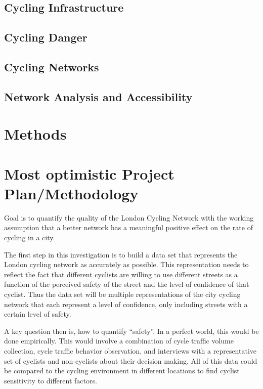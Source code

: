 \documentclass[11pt]{article} %
\begin{document}
\subsection{Cycling Infrastructure}

\subsection{Cycling Danger}

\subsection{Cycling Networks}

\subsection{Network Analysis and Accessibility}

\section{Methods}


\section{Most optimistic Project Plan/Methodology}

Goal is to quantify the quality of the London Cycling Network with the working assumption that a better network has a meaningful positive effect on the rate of cycling in a city. 

The first step in this investigation is to build a data set that represents the London cycling network as accurately as possible. This representation needs to reflect the fact that different cyclists are willing to use different streets as a function of the perceived safety of the street and the level of confidence of that cyclist. Thus the data set will be multiple representations of the city cycling network that each represent a level of confidence, only including streets with a certain level of safety. 

A key question then is, how to quantify ``safety''. In a perfect world, this would be done empirically. This would involve a combination of cycle traffic volume collection, cycle traffic behavior observation, and interviews with a representative set of cyclists and non-cyclists about their decision making. All of this data could be compared to the cycling environment in different locations to find cyclist sensitivity to different factors.  
\end{document}
